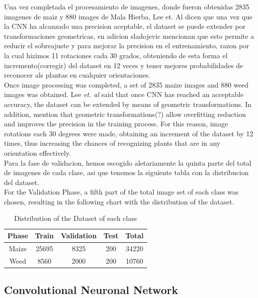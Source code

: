 \documentclass[conference]{IEEEtran}
\begin{document}
Una vez completada el procesamiento de imagenes, donde fueron obtenidas 2835 imagenes de maiz y 880 images de Mala Hierba, Lee et. Al dicen que una vez que la CNN ha alcanzado una precision aceptable, el dataset se puede extender por transformaciones geometricas, en adicion sladojevic mencionan que esto permite a reducir el sobreajuste y para mejorar la precision en el entrenamiento, razon por la cual hizimos 11 rotaciones cada 30 grados, obteniendo de esta forma el incremento(corregir) del dataset en 12 veces y tener mejores probabilidades de reconocer als plantas en cualquier orientaciones. \\
	
Once image processing was completed, a set of 2835 maize images and 880 weed images was obtained. Lee \textit{et. al} \cite{lee2015deep} said that once CNN has reached an acceptable accuracy, the dataset can be extended by means of geometric transformations. In addition, \cite{sladojevic2016deep} mention that geometric transformations(?) allow overfitting reduction  and improves the precision in the training process. For this reason, image rotations each 30 degrees were made, obtaining an increment of the dataset by 12 times, thus increasing the chances of recognizing plants that are in any orientation effectively. \\

Para la fase de validacion, hemos escogido aletariamente la quinta parte del total de imagenes de cada clase, asi que tenemos la siguiente tabla con la distribucion del dataset.\\

For the Validation Phase, a fifth part of the total image set of each class was chosen, resulting in the following chart with the distribution of the dataset.

\begin{table}[h!]
\centering
\begin{tabular}{| c  c  c  c  c |} 
 \hline
 \textbf{Phase} & \textbf{Train} & \textbf{Validation} &\textbf{Test}  & \textbf{Total} \\ [1ex] 
 \hline
 Maize & 25695 & 8325 & 200 & 34220  \\ 
 Weed & 8560 & 2000 & 200 & 10760\\ 
 \hline
\end{tabular}
\caption{Distribution of the Dataset of each class}
\label{table:1}
\end{table}
	
	
\subsection{Convolutional Neuronal Network}
\end{document}

